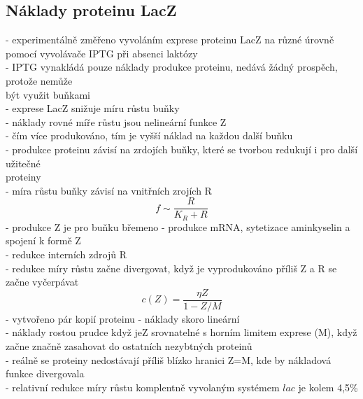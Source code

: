 \documentclass[11pt,a4paper]{report}
\begin{document}
\subsection{Náklady proteinu LacZ}
- experimentálně změřeno vyvoláním exprese proteinu LacZ na různé úrovně pomocí vyvolávače IPTG při absenci laktózy\\
\indent - IPTG vynakládá pouze náklady produkce proteinu, nedává žádný prospěch, protože nemůže\\
\indent \indent být využit buňkami\\
- exprese LacZ snižuje míru růstu buňky\\
\indent - náklady rovné míře růstu jsou nelineární funkce Z\\
\indent \indent - čím více produkováno, tím je vyšší náklad na každou další buňku\\
\indent \indent - produkce proteinu závisí na zrdojích buňky, které se tvorbou redukují i pro další užitečné\\
\indent \indent \indent proteiny\\
\indent - míra růstu buňky závisí na vnitřních zrojích R\\
\begin{equation}
f\sim\frac{R}{K_R+R}
\end{equation}
- produkce Z je pro buňku břemeno - produkce mRNA, sytetizace aminkyselin a spojení k formě Z\\
\indent - redukce interních zdrojů R\\
\indent - redukce míry růstu začne divergovat, když je vyprodukováno příliš Z a R se začne vyčerpávat\\
\begin{equation}
c(Z)=\frac{\eta Z}{1-Z/M}
\end{equation}
- vytvořeno pár kopií proteinu - náklady skoro lineární\\
- náklady rostou prudce když jeZ srovnatelné s horním limitem exprese (M), když začne značně zasahovat do ostatních nezybtných proteinů\\
\indent - reálně se proteiny nedostávají příliš blízko hranici Z=M, kde by nákladová funkce divergovala\\
- relativní redukce míry růstu komplentně vyvolaným systémem $lac$ je kolem 4,5\%\\
\end{document}
